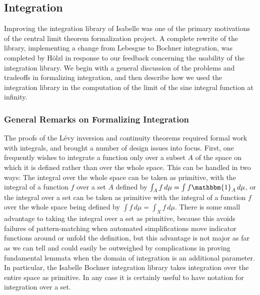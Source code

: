 \documentclass[leqno]{article}
\theoremstyle{definition}
\begin{document}
\subsection{Integration}

Improving the integration library of Isabelle was one of the primary motivations of the central limit theorem formalization project. A complete rewrite of the library, implementing a change from Lebesgue to Bochner integration, was completed by H\"olzl in response to our feedback concerning the usability of the integration library. We begin with a general discussion of the problems and tradeoffs in formalizing integration, and then describe how we used the integration library in the computation of the limit of the sine integral function at infinity.

\subsubsection{General Remarks on Formalizing Integration} \label{sec:form_int}

The proofs of the L\'evy inversion and continuity theorems required formal work with integrals, and brought a number of design issues into focus. First, one frequently wishes to integrate a function only over a subset $A$ of the space on which it is defined rather than over the whole space. This can be handled in two ways: The integral over the whole space can be taken as primitive, with the integral of a function $f$ over a set $A$ defined by $\int_A f \, d\mu = \int f \mathbbm{1}_A \, d\mu$, or the integral over a set can be taken as primitive with the integral of a function $f$ over the whole space being defined by $\int f \, d\mu = \int_X f \, d\mu$. There is some small advantage to taking the integral over a set as primitive, because this avoids failures of pattern-matching when automated simplifications move indicator functions around or unfold the definition, but this advantage is not major as far as we can tell and could easily be outweighed by complications in proving fundamental lemmata when the domain of integration is an additional parameter. In particular, the Isabelle Bochner integration library takes integration over the entire space as primitive. In any case it is certainly useful to have notation for integration over a set.
\end{document}
